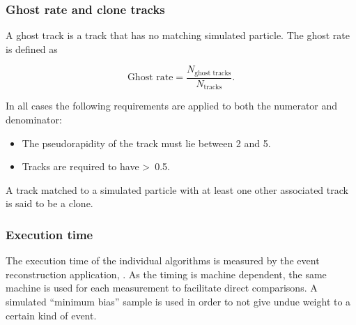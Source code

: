 \subsubsection{Ghost rate and clone tracks}
\label{sec:track:gr}
A ghost track is a track that has no matching simulated particle. The ghost rate is defined as

\begin{equation}
\text{Ghost rate}  = \frac{N_{\text{ghost~tracks}}}{N_{\text{tracks}}}.
\end{equation}

\noindent In all cases the following requirements are applied to both the numerator and denominator:

\begin{itemize}
\item The pseudorapidity of the track must lie between 2 and 5.
\item Tracks are required to have \pt\textgreater~0.5\gevc.
\end{itemize}

A track matched to a simulated particle with at least one other associated track is said to be a clone.

\subsubsection{Execution time}
\label{sec:track:timing}

The execution time of the individual algorithms is measured by the \lhcb event reconstruction application, \brunel. As the timing is machine dependent, the same machine is used for each measurement to facilitate direct comparisons. A simulated ``minimum bias'' sample is used in order to not give undue weight to a certain kind of event.

